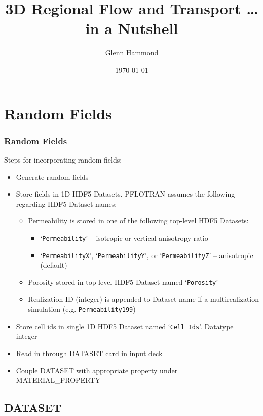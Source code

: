 \documentclass{beamer}
\begin{document}
\title{3D Regional Flow and Transport \ldots in a Nutshell}
\author{Glenn Hammond}
\date{\today}


\section{Random Fields}

\begin{frame}\frametitle{Random Fields}

Steps for incorporating random fields:
  \begin{itemize}
    \item Generate random fields
    \item Store fields in 1D HDF5 Datasets. PFLOTRAN assumes the following regarding HDF5 Dataset names:
      \begin{itemize}
        \item Permeability is stored in one of the following top-level HDF5 Datasets:
        \begin{itemize}
          \item `\verb=Permeability=' -- isotropic or vertical anisotropy ratio
          \item `\verb=PermeabilityX=', `\verb=PermeabilityY=', or `\verb=PermeabilityZ=' -- anisotropic (default)
        \end{itemize}
        \item Porosity stored in top-level HDF5 Dataset named `\verb=Porosity='
        \item Realization ID (integer) is appended to Dataset name if a multirealization simulation (e.g. \verb=Permeability199=)
      \end{itemize}
    \item Store cell ids in single 1D HDF5 Dataset named `\verb=Cell Ids='. Datatype = integer
    \item Read in through DATASET card in input deck
    \item Couple DATASET with appropriate property under MATERIAL\_PROPERTY
  \end{itemize}

\end{frame}

\subsection{DATASET}
\end{document}
